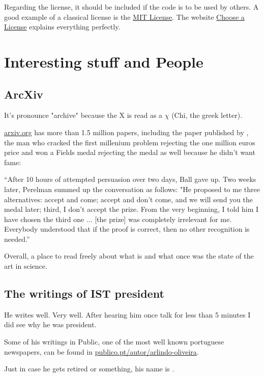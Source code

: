 \par Regarding the license, it should be included if the code is to be used by others. A good example of a classical license is the \href{https://choosealicense.com/licenses/mit/}{MIT License}. The website \href{https://choosealicense.com}{Choose a License} explains everything perfectly.




\section{Interesting stuff and People}

\subsection{ArcXiv}
\par It's pronounce "archive" because the X is read as a $\chi$ (Chi, the greek letter).
\par \href{https://arxiv.org/}{\ul{arxiv.org}} has more than 1.5 million papers, including the paper published by , the man who cracked the first millenium problem rejecting the one million euros price and won a Fields medal rejecting the medal as well because he didn't want fame: 

\begin{center}
    ``After 10 hours of attempted persuasion over two days, Ball gave up. Two weeks later, Perelman summed up the conversation as follows: "He proposed to me three alternatives: accept and come; accept and don't come, and we will send you the medal later; third, I don't accept the prize. From the very beginning, I told him I have chosen the third one ... [the prize] was completely irrelevant for me. Everybody understood that if the proof is correct, then no other recognition is needed.''
\end{center}
\par Overall, a place to read freely about what is and what once was the state of the art in science.

\subsection{The writings of IST president}
\par He writes well. Very well. After hearing him once talk for less than 5 minutes I did see why he was president.
\par Some of his writings in Public, one of the most well known portuguese newspapers, can be found in \href{https://www.publico.pt/autor/arlindo-oliveira}{\ul{publico.pt/autor/arlindo-oliveira}}.
\par Just in case he gets retired or something, his name is .




